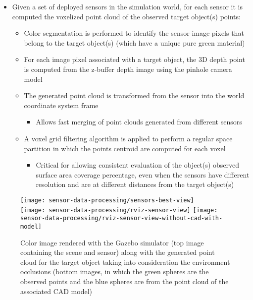 \begin{itemize}
	\item Given a set of deployed sensors in the simulation world, for each sensor it is computed the voxelized point cloud of the observed target object(s) points:
	\begin{itemize}
		\item Color segmentation is performed to identify the sensor image pixels that belong to the target object(s) (which have a unique pure green material)
		\item For each image pixel associated with a target object, the 3D depth point is computed from the z-buffer depth image using the pinhole camera model
		\item The generated point cloud is transformed from the sensor into the world coordinate system frame
		\begin{itemize}
			\item Allows fast merging of point clouds generated from different sensors
		\end{itemize}
		\item A voxel grid filtering algorithm is applied to perform a regular space partition in which the points centroid are computed for each voxel
		\begin{itemize}
			\item Critical for allowing consistent evaluation of the object(s) observed surface area coverage percentage, even when the sensors have different resolution and are at different distances from the target object(s)
		\end{itemize}
	\end{itemize}
\end{itemize}

\begin{figure}
	\centering
	\texttt{[image: sensor-data-processing/sensors-best-view]}\\
	\vspace{0.5em}
	\texttt{[image: sensor-data-processing/rviz-sensor-view]}\hspace{2em}
	\texttt{[image: sensor-data-processing/rviz-sensor-view-without-cad-with-model]}
	\caption{Color image rendered with the Gazebo simulator (top image containing the scene and sensor) along with the generated point cloud for the target object taking into consideration the environment occlusions (bottom images, in which the green spheres are the observed points and the blue spheres are from the point cloud of the associated CAD model)}
\end{figure}


